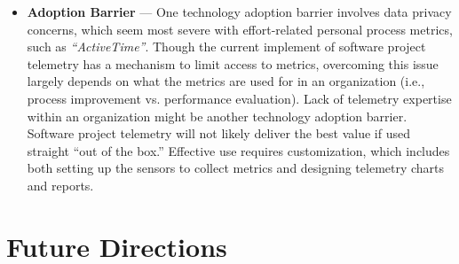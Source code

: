 \begin{itemize}
	\item \textbf{Adoption Barrier} --- One technology adoption barrier involves data privacy concerns, which seem most severe with effort-related personal process metrics, such as \textit{``ActiveTime''}. Though the current implement of software project telemetry has a mechanism to limit access to metrics, overcoming this issue largely depends on what the metrics are used for in an organization (i.e., process improvement vs. performance evaluation). Lack of telemetry expertise within an organization might be another technology adoption barrier.	Software project telemetry will not likely deliver the best value if used straight ``out of the box.'' Effective use requires customization, which includes both setting up the sensors to collect metrics and designing telemetry charts and reports.
	
	
\end{itemize}








\section{Future Directions} \label{Conclusion:FutureDirections}


%
%


